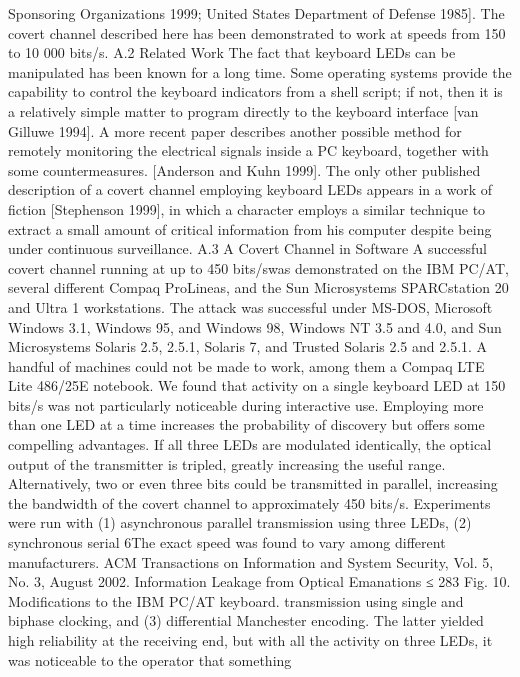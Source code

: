 Sponsoring Organizations 1999; United States Department of Defense 1985]. 
The covert channel described here has been demonstrated to work at speeds 
from 150 to 10 000 bits/s. 
A.2 Related Work 
The fact that keyboard LEDs can be manipulated has been known for a long 
time. Some operating systems provide the capability to control the keyboard 
indicators from a shell script; if not, then it is a relatively simple matter to 
program directly to the keyboard interface [van Gilluwe 1994]. 
A more recent paper describes another possible method for remotely monitoring 
the electrical signals inside a PC keyboard, together with some countermeasures. 
[Anderson and Kuhn 1999]. The only other published description 
of a covert channel employing keyboard LEDs appears in a work of fiction 
[Stephenson 1999], in which a character employs a similar technique to extract 
a small amount of critical information from his computer despite being under 
continuous surveillance. 
A.3 A Covert Channel in Software 
A successful covert channel running at up to 450 bits/swas demonstrated on the 
IBM PC/AT, several different Compaq ProLineas, and the Sun Microsystems 
SPARCstation 20 and Ultra 1 workstations. The attack was successful under 
MS-DOS, Microsoft Windows 3.1, Windows 95, and Windows 98, Windows NT 
3.5 and 4.0, and Sun Microsystems Solaris 2.5, 2.5.1, Solaris 7, and Trusted 
Solaris 2.5 and 2.5.1. A handful of machines could not be made to work, among 
them a Compaq LTE Lite 486/25E notebook. 
We found that activity on a single keyboard LED at 150 bits/s was not particularly 
noticeable during interactive use. Employing more than one LED at 
a time increases the probability of discovery but offers some compelling advantages. 
If all three LEDs are modulated identically, the optical output of the 
transmitter is tripled, greatly increasing the useful range. Alternatively, two 
or even three bits could be transmitted in parallel, increasing the bandwidth of 
the covert channel to approximately 450 bits/s. Experiments were run with (1) 
asynchronous parallel transmission using three LEDs, (2) synchronous serial 
6The exact speed was found to vary among different manufacturers. 
ACM Transactions on Information and System Security, Vol. 5, No. 3, August 2002.
Information Leakage from Optical Emanations ≤ 283 
Fig. 10. Modifications to the IBM PC/AT keyboard. 
transmission using single and biphase clocking, and (3) differential Manchester 
encoding. The latter yielded high reliability at the receiving end, but with all 
the activity on three LEDs, it was noticeable to the operator that something 
